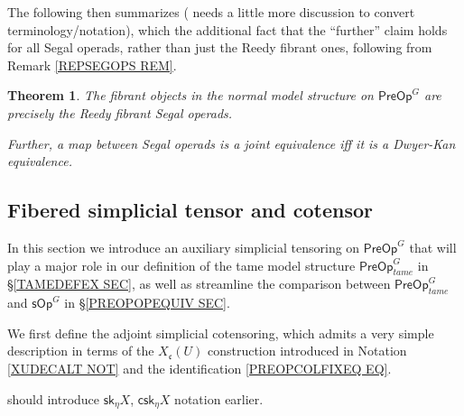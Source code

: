 \documentclass[a4paper,10pt
,draft
]{article}%
\numberwithin{equation}{section}
\numberwithin{figure}{section}
\newtheorem{theorem}[equation]{Theorem}%
\theoremstyle{definition} %
\newcommand{\1}{\ensuremath{\mathbbm 1}}%
\begin{document}
The following then summarizes 
\cite[Thms. 5.51 and 5.48]{BP_edss}
({\color{blue} needs a little more discussion to convert terminology/notation}),
which the additional fact that the ``further'' claim
holds for all Segal operads, rather than just the Reedy fibrant ones, 
following from Remark \ref{REPSEGOPS REM}.


\begin{theorem}
	The fibrant objects in the normal model structure on 
	$\mathsf{PreOp}^G$
	are precisely the Reedy fibrant Segal operads.
	
	Further, a map between Segal operads is a joint equivalence iff it is a Dwyer-Kan equivalence.
\end{theorem}







\subsection{Fibered simplicial tensor and cotensor}
\label{FIBTENS_SEC}


In this section we introduce an auxiliary 
simplicial tensoring on
$\mathsf{PreOp}^G$
that will play a major role in our definition of the tame model structure 
$\mathsf{PreOp}^G_{tame}$ in \S \ref{TAMEDEFEX SEC},
as well as streamline the comparison 
between
$\mathsf{PreOp}^G_{tame}$
and 
$\mathsf{sOp}^G$ in \S \ref{PREOPOPEQUIV SEC}.

We first define the adjoint simplicial cotensoring,
which admits a very simple description in terms
of the $X_{\mathfrak{c}}(U)$ construction introduced in
Notation \ref{XUDECALT NOT}
and the identification 
\eqref{PREOPCOLFIXEQ EQ}.

{\color{blue} should introduce $\mathsf{sk}_\eta X$, $\mathsf{csk}_\eta X$ notation earlier}.
\end{document}
